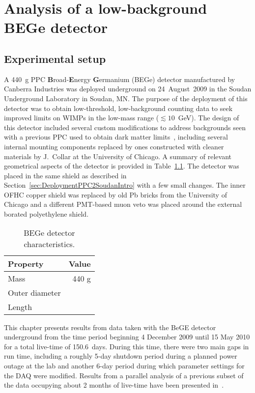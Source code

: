 \chapter{Analysis of a low-background BEGe detector}
\label{chap:AnalysisBeGe}
	\section{Experimental setup}
	\label{sec:BeGeExperimentalSetup}

A 440~g PPC \textbf{B}road-\textbf{E}nergy \textbf{G}ermanium (BEGe) detector manufactured by Canberra Industries was deployed underground on 24~August~2009 in the Soudan Underground Laboratory in Soudan, MN.  The purpose of the deployment of this detector was to obtain low-threshold, low-background counting data to seek improved limits on WIMPs in the low-mass range ($\lesssim10$~GeV).  The design of this detector included several custom modifications to address backgrounds seen with a previous PPC used to obtain dark matter limits~\cite{Aalseth:2008aa}, including several internal mounting components replaced by ones constructed with cleaner materials by J.~Collar at the University of Chicago.  A summary of relevant geometrical aspects of the detector is provided in Table~\ref{tab:BEGeCharacteristics}.
The detector was placed in the same shield as described in Section~\ref{sec:DeploymentPPC2SoudanIntro} with a few small changes.  The inner OFHC copper shield was replaced by old Pb bricks from the University of Chicago and a different PMT-based muon veto was placed around the external borated polyethylene shield.   %

			\begin{table}
				\centering
				\begin{tabular}{l r}
					\toprule
					Property & Value \\
					\midrule
					Mass & 440 g \\
					Outer diameter &  \\
					Length &  \\
					\bottomrule
				\end{tabular}
				\caption[BEGe detector characteristics]
				{BEGe detector characteristics.  }
				\label{tab:BEGeCharacteristics}
			\end{table}

This chapter presents results from data taken with the BeGE detector underground from the time period beginning 4 December 2009 until 15 May 2010 for a total live-time of 150.6~days.  During this time, there were two main gaps in run time, including a roughly 5-day shutdown period during a planned power outage at the lab and another 6-day period during which parameter settings for the DAQ were modified.  Results from a parallel analysis of a previous subset of the data occupying about 2 months of live-time have been presented in~\cite{Aalseth:2010aa}.

